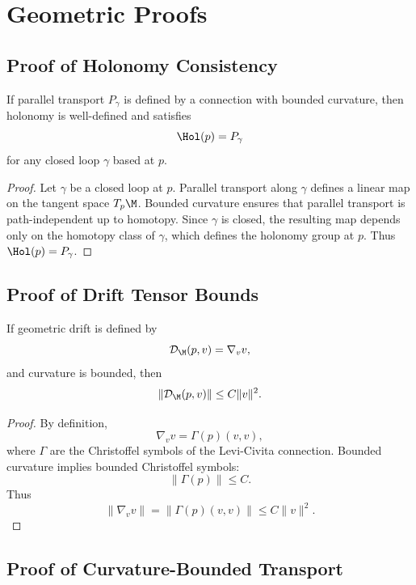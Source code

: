 
\section{Geometric Proofs}

\subsection{Proof of Holonomy Consistency}

\begin{lemma}
If parallel transport $P_\gamma$ is defined by a connection with bounded
curvature, then holonomy is well-defined and satisfies
\[
\Hol(p) = P_\gamma
\]
for any closed loop $\gamma$ based at $p$.
\end{lemma}

\begin{proof}
Let $\gamma$ be a closed loop at $p$. Parallel transport along $\gamma$
defines a linear map on the tangent space $T_p\M$. Bounded curvature
ensures that parallel transport is path-independent up to homotopy. Since
$\gamma$ is closed, the resulting map depends only on the homotopy class of
$\gamma$, which defines the holonomy group at $p$. Thus
$\Hol(p) = P_\gamma$.
\end{proof}

\subsection{Proof of Drift Tensor Bounds}

\begin{lemma}
If geometric drift is defined by
\[
\mathcal{D}_\M(p,v) = \nabla_v v,
\]
and curvature is bounded, then
\[
\|\mathcal{D}_\M(p,v)\| \le C \|v\|^2.
\]
\end{lemma}

\begin{proof}
By definition,
\[
\nabla_v v = \Gamma(p)(v,v),
\]
where $\Gamma$ are the Christoffel symbols of the Levi-Civita connection.
Bounded curvature implies bounded Christoffel symbols:
\[
\|\Gamma(p)\| \le C.
\]
Thus
\[
\|\nabla_v v\|
= \|\Gamma(p)(v,v)\|
\le C \|v\|^2.
\]
\end{proof}

\subsection{Proof of Curvature-Bounded Transport}

